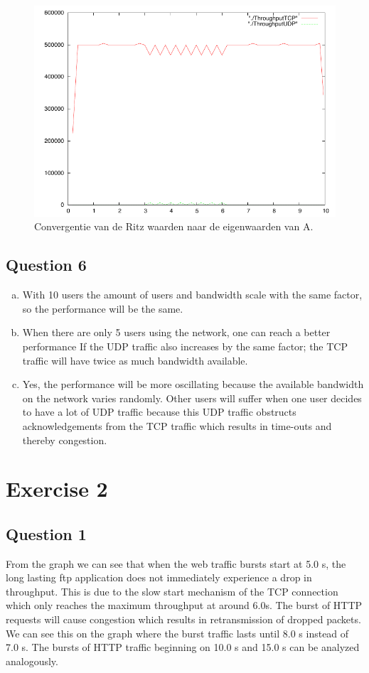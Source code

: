 \documentclass[a4paper]{report}
\newcommand{\opgave}[1]{\section{Question #1}}
\begin{document}
\begin{figure}[htb]
\centerline{\includegraphics{Exercise1/Question5/Question5.pdf}}
\caption{Convergentie van de Ritz waarden naar de eigenwaarden van A.}
\label{fig:figure3}
\end{figure}

\opgave{6}
\begin{enumerate}[a)]
\item 
With 10 users the amount of users and bandwidth scale with the same factor, so the performance will be the same.

\item
When there are only 5 users using the network, one can reach a better performance If the UDP traffic also increases by the same factor; the TCP traffic will have twice as much bandwidth available.

\item
Yes, the performance will be more oscillating because the available bandwidth on the network varies randomly. Other users will suffer when one user decides to have a lot of UDP traffic because this UDP traffic obstructs acknowledgements from the TCP traffic which results in time-outs and thereby congestion.
\end{enumerate}

\setcounter{chapter}{2}
\setcounter{section}{0}
\chapter*{Exercise 2}
\opgave{1}
From the graph we can see that when the web traffic bursts start at 5.0 s, the long lasting ftp application does not immediately experience a drop in throughput. This is due to the slow start mechanism of the TCP connection which only reaches the maximum throughput at around 6.0s. The burst of HTTP requests will cause congestion which results in retransmission of dropped packets. We can see this on the graph where the burst traffic lasts until 8.0 s instead of 7.0 s. The bursts of HTTP traffic beginning on 10.0 s and 15.0 s can be analyzed analogously.
\end{document}

